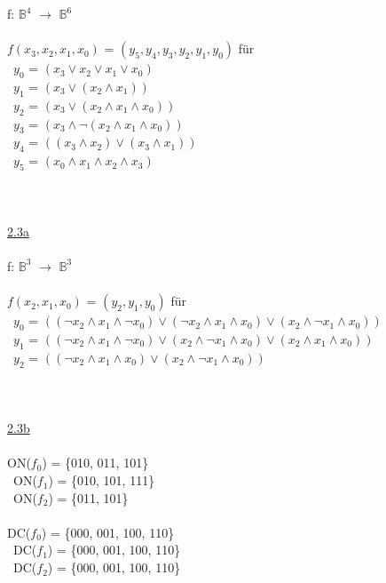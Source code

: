 \documentclass[a4paper,10pt]{scrartcl}
\begin{document}
f: $\mathbb{B}^4$ $\rightarrow$ $\mathbb{B}^6$\\\\
$f(x_{3},x_{2},x_{1},x_{0})$ = $(y_{5},y_{4},y_{3},y_{2},y_{1},y_{0})$ für\\\
$y_{0}$ = $(x_{3} \lor x_{2} \lor x_{1} \lor x_{0})$\\\
$y_{1}$ = $(x_{3} \lor (x_{2} \land x_{1}))$\\\
$y_{2}$ = $(x_{3} \lor (x_{2} \land x_{1} \land x_{0}))$\\\
$y_{3}$ = $(x_{3} \land \lnot(x_{2} \land x_{1} \land x_{0}))$\\\
$y_{4}$ = $((x_{3} \land x_{2}) \lor (x_{3} \land x_{1}))$\\\
$y_{5}$ = $(x_{0} \land x_{1} \land x_{2} \land x_{3})$\\\
\\\\\\

\underline{2.3a}\\\\
f: $\mathbb{B}^3$ $\rightarrow$ $\mathbb{B}^3$\\\\
$f(x_{2},x_{1},x_{0})$ = $(y_{2},y_{1},y_{0})$ für\\\
$y_{0}$ = $((\lnot x_{2} \land x_{1} \land \lnot x_{0}) \lor (\lnot x_{2} \land x_{1} \land x_{0}) \lor (x_{2} \land \lnot x_{1} \land x_{0}))$\\\
$y_{1}$ = $((\lnot x_{2} \land x_{1} \land \lnot x_{0}) \lor (x_{2} \land \lnot x_{1} \land x_{0}) \lor (x_{2} \land x_{1} \land x_{0}))$\\\
$y_{2}$ = $((\lnot x_{2} \land x_{1} \land x_{0}) \lor (x_{2} \land \lnot x_{1} \land x_{0}))$\\\
\\\\\\

\underline{2.3b}\\\\
ON($f_{0}$) = \{010, 011, 101\}\\\
ON($f_{1}$) = \{010, 101, 111\}\\\
ON($f_{2}$) = \{011, 101\}\\\\
DC($f_{0}$) = \{000, 001, 100, 110\}\\\
DC($f_{1}$) = \{000, 001, 100, 110\}\\\
DC($f_{2}$) = \{000, 001, 100, 110\}\\\
\end{document}
